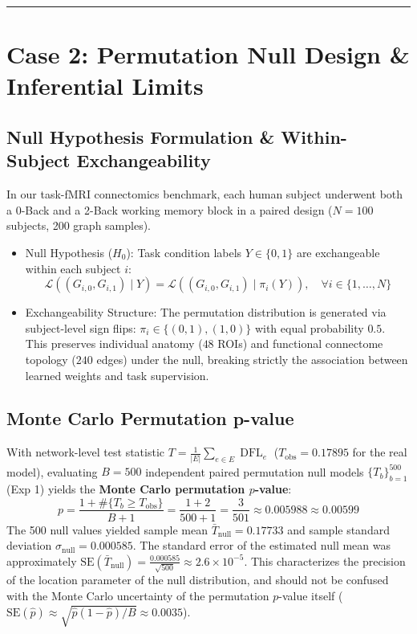 \documentclass[11pt,a4paper]{article}
\begin{document}
\vspace{0.5em}
\hrule
\vspace{1em}

\section{Case 2: Permutation Null Design \& Inferential Limits}

\subsection{Null Hypothesis Formulation \& Within-Subject Exchangeability}
In our task-fMRI connectomics benchmark, each human subject underwent both a 0-Back and a 2-Back working memory block in a paired design ($N = 100$ subjects, 200 graph samples).
\begin{itemize}
    \item Null Hypothesis ($H_0$): Task condition labels $Y \in \{0, 1\}$ are exchangeable within each subject $i$:
    \begin{equation}
    \mathcal{L}\left((G_{i,0}, G_{i,1}) \mid Y\right) = \mathcal{L}\left((G_{i,0}, G_{i,1}) \mid \pi_i(Y)\right), \quad \forall i \in \{1, \dots, N\}
    \end{equation}
    \item Exchangeability Structure: The permutation distribution is generated via subject-level sign flips: $\pi_i \in \{(0, 1), (1, 0)\}$ with equal probability $0.5$. This preserves individual anatomy ($48$ ROIs) and functional connectome topology ($240$ edges) under the null, breaking strictly the association between learned weights and task supervision.
\end{itemize}

\subsection{Monte Carlo Permutation p-value}
With network-level test statistic $T = \frac{1}{|E|} \sum_{e \in E} \operatorname{DFL}_e$ ($T_{\mathrm{obs}} = 0.17895$ for the real model), evaluating $B = 500$ independent paired permutation null models $\{T_b\}_{b=1}^{500}$ (Exp 1) yields the \textbf{Monte Carlo permutation $p$-value}:
\begin{equation}
\boxed{
p = \frac{1 + \#\{T_b \ge T_{\mathrm{obs}}\}}{B + 1} = \frac{1 + 2}{500 + 1} = \frac{3}{501} \approx 0.005988 \approx 0.00599
}
\end{equation}
The 500 null values yielded sample mean $\bar{T}_{\mathrm{null}} = 0.17733$ and sample standard deviation $\sigma_{\mathrm{null}} = 0.000585$. The standard error of the estimated null mean was approximately $\mathrm{SE}(\bar{T}_{\mathrm{null}}) = \frac{0.000585}{\sqrt{500}} \approx 2.6 \times 10^{-5}$. This characterizes the precision of the location parameter of the null distribution, and should not be confused with the Monte Carlo uncertainty of the permutation $p$-value itself ($\mathrm{SE}(\hat{p}) \approx \sqrt{\hat{p}(1-\hat{p})/B} \approx 0.0035$).
\end{document}
